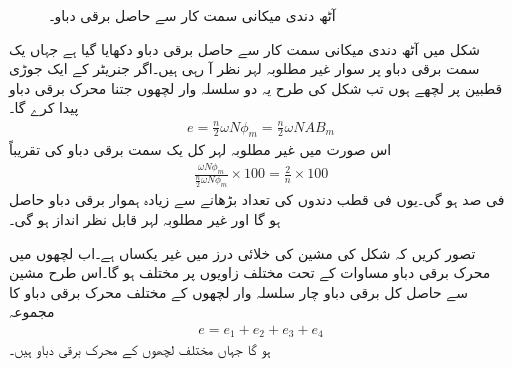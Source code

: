 \begin{figure}
\centering
\caption{آٹھ دندی میکانی سمت کار سے حاصل برقی دباو۔}
\label{شکل_یکسمتی-آٹھ_دندوں_سمتکار_کی_لہر}
\end{figure}

شکل   میں آٹھ دندی میکانی سمت کار سے حاصل برقی دباو دکھایا گیا ہے جہاں  یک سمت  برقی دباو پر سوار غیر مطلوبہ  لہر نظر آ رہی ہیں۔اگر جنریٹر  کے ایک جوڑی قطبین پر  لچھے ہوں تب شکل   کی طرح یہ دو   سلسلہ وار لچھوں جتنا محرک برقی دباو پیدا کرے گا۔
\begin{align}\label{مساوات_یکسمتی_پیدا_دباو_الف}
e=\frac{n}{2} \omega N \phi_m=\frac{n}{2} \omega N A B_m
\end{align}
اس صورت میں  غیر مطلوبہ لہر کل یک سمت  برقی دباو کی تقریباً
\begin{align}\label{مساوات_یکسمتی_فی_صد_لہر}
\frac{\omega N \phi_m}{\frac{n}{2} \omega N \phi_m} \times 100=\frac{2}{n} \times 100
\end{align}
فی صد ہو گی۔یوں فی قطب دندوں کی تعداد بڑھانے سے زیادہ ہموار برقی دباو حاصل ہو گا اور غیر مطلوبہ لہر قابل نظر انداز ہو گی۔

تصور کریں کہ شکل   کی مشین کی خلائی درز میں  غیر  یکساں  ہے۔اب لچھوں میں محرک برقی دباو مساوات   کے تحت مختلف زاویوں پر مختلف ہو گا۔اس طرح مشین سے حاصل کل برقی دباو چار سلسلہ وار لچھوں کے مختلف محرک برقی دباو کا مجموعہ 
\begin{align} \label{مساوات_یکسمتی_کل_دباو_مجموعہ}
e=e_1+e_2+e_3+e_4
\end{align}
ہو گا جہاں   مختلف لچھوں کے محرک برقی دباو  ہیں۔

